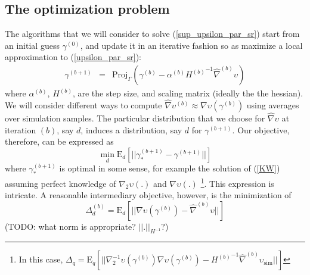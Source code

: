 \documentclass[11pt]{article}
\begin{document}
\subsection{The optimization problem}
The algorithms that we will consider to solve
(\ref{sup_upsilon_par_sr}) start from an initial guess
$\gamma^{(0)}$, and update it in an iterative fashion so as maximize
a local approximation to (\ref{upsilon_par_sr}):
\begin{eqnarray}\label{KW}
\gamma^{(b+1)}&=&\mathrm{Proj}_{\Gamma}(\gamma^{(b)}-\alpha^{(b)}
{H^{(b)}}^{-1}\widehat{\nabla}^{(b)} \upsilon)
\end{eqnarray}where
$\alpha^{(b)}$, $H^{(b)}$, are the step size, and scaling matrix
(ideally the the hessian). We will consider different ways to
compute $\widehat{\nabla} \upsilon^{(b)} \approx \nabla
\upsilon(\gamma^{(b)})$ using averages over simulation samples. The
particular distribution that we choose for $\widehat{\nabla}
\upsilon$ at iteration $(b)$, say $d$, induces a distribution, say
$d$ for $\gamma^{(b+1)}$. Our objective, therefore, can be expressed
as
\begin{equation}
\min_d \mathrm{E}_d[||\gamma_*^{(b+1)}-\gamma^{(b+1)}||]
\end{equation}where $\gamma_*^{(b+1)}$ is optimal in some sense, for
example the solution of (\ref{KW}) assuming perfect knowledge of
$\nabla_2 \upsilon(.)$ and $\nabla \upsilon(.)$ \footnote{In this
case, $\Delta_q=\mathrm{E}_q[||\nabla_2^{-1}
\upsilon(\gamma^{(b)})\nabla
\upsilon(\gamma^{(b)})-{H^{(b)}}^{-1}\widehat\nabla^{(b)}\upsilon_{\mathrm{sim}}||]$}.
This expression is intricate. A reasonable intermediary objective,
however, is the minimization of
\begin{equation}\label{gradient_distance}
\Delta_d^{(b)} = \mathrm{E}_d[||\nabla
\upsilon(\gamma^{(b)})-\widehat\nabla^{(b)} \upsilon||]
\end{equation}(TODO: what norm is appropriate? $||.||_{H^{-1}}$?)
\end{document}
